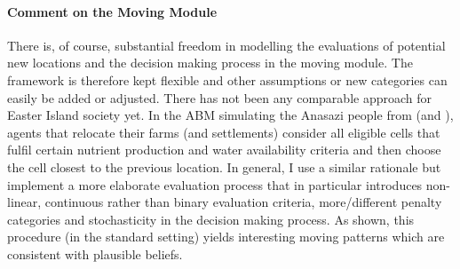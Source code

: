 \paragraph{Comment on the Moving Module}
There is, of course, substantial freedom in modelling the evaluations of potential new locations and the decision making process in the moving module.
The framework is therefore kept flexible and other assumptions or new categories can easily be added or adjusted.
There has not been any comparable approach for Easter Island society yet.
In the ABM simulating the Anasazi people from \citet{Axtell2002} (and \citet{Janssen2009}), agents that relocate their farms (and settlements) consider all eligible cells that fulfil certain nutrient production and water availability criteria and then choose the cell closest to the previous location.
In general, I use a similar rationale but implement a more elaborate evaluation process that in particular introduces non-linear, continuous rather than binary evaluation criteria, more/different penalty categories and stochasticity in the decision making process.  
As shown, this procedure (in the standard setting) yields interesting moving patterns which are consistent with plausible beliefs.



